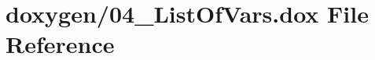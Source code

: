 \hypertarget{04__ListOfVars_8dox}{\section{doxygen/04\+\_\+\+List\+Of\+Vars.dox File Reference}
\label{04__ListOfVars_8dox}
}
